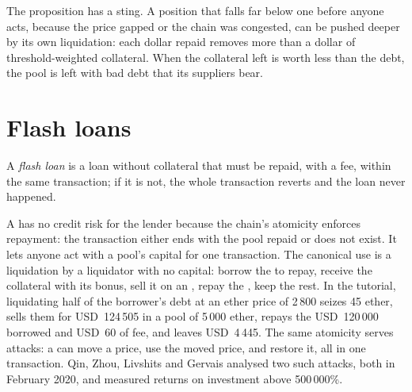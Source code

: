 The proposition has a sting. A position that falls far below one before anyone acts, because the price gapped or the chain was congested, can
be pushed deeper by its own liquidation: each dollar repaid removes more than a dollar of threshold-weighted collateral. When the collateral left
is worth less than the debt, the pool is left with bad debt that its suppliers bear.

\section{Flash loans}

\begin{definition}\label{def:m3:defi-credit-and-leverage:flash}
A \emph{flash loan} is a loan without collateral that must be repaid, with a fee, within the same transaction; if it is not,
the whole transaction reverts and the loan never happened.
\end{definition}

A  has no credit risk for the lender because the chain's atomicity enforces repayment: the transaction either ends with the pool repaid
or does not exist. It lets anyone act with a pool's capital for one transaction. The canonical use is a liquidation by a liquidator with no capital:
borrow the  to repay, receive the collateral with its bonus, sell it on an , repay the , keep the rest.
In the tutorial, liquidating half of the borrower's debt at an ether price of 2\,800 seizes 45 ether, sells them for USD~124\,505 in a pool of
5\,000 ether, repays the USD~120\,000 borrowed and USD~60 of fee, and leaves USD~4\,445. The same atomicity serves attacks: a  can
move a price, use the moved price, and restore it, all in one transaction. Qin, Zhou, Livshits and Gervais analysed two such attacks, both
in February 2020, and measured returns on investment above 500\,000\%.

